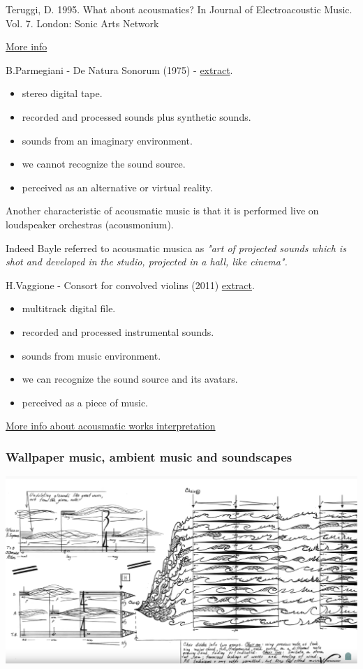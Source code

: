 Teruggi, D. 1995. What about acousmatics? In Journal of Electroacoustic
Music. Vol. 7. London: Sonic Arts Network

\href{img/teruggi.pdf}{More info}

B.Parmegiani - De Natura Sonorum (1975) - \href{suoni/parmegiani.mp3}{extract}.

\begin{itemize}
\tightlist
\item stereo digital tape.
\item recorded and processed sounds plus synthetic sounds.
\item sounds from an imaginary environment.
\item we cannot recognize the sound source.
\item perceived as an alternative or virtual reality.
\end{itemize}

Another characteristic of acousmatic music is that it is performed live on loudspeaker orchestras (acousmonium).

Indeed Bayle referred to acousmatic musica as \textit{"art of projected sounds which is shot and developed in the studio, projected in a hall, like cinema".}

H.Vaggione - Consort for convolved violins (2011) \href{suoni/vaggione.mp3}{extract}.

\begin{itemize}
\tightlist
\item multitrack digital file.
\item recorded and processed instrumental sounds.
\item sounds from music environment.
\item we can recognize the sound source and its avatars.
\item perceived as a piece of music.
\end{itemize}

\href{img/space.pdf}{More info about acousmatic works interpretation}

\subsubsection{Wallpaper music, ambient music and soundscapes }\label{wallpaper-music-ambient-music-and-soundscapes}

\begin{center}
\includegraphics[scale=0.7]{../img/schaefer.png}
\end{center}

